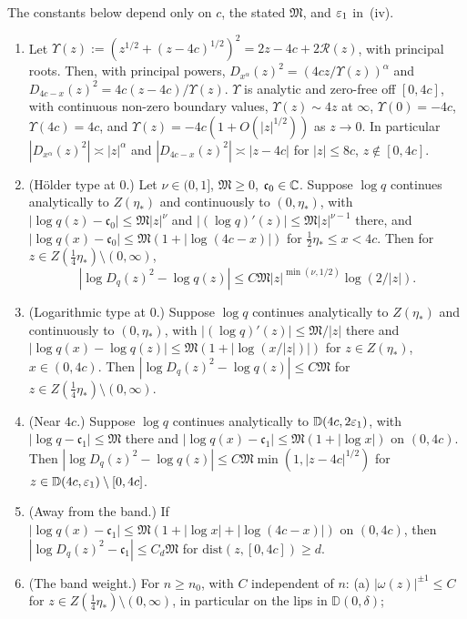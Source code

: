 \begin{lemma}\label{lem:szego}
The constants below depend only on $c$, the stated $\mathfrak M$, and $\varepsilon_1$ in~(iv).
\begin{enumerate}
\item[(i)] Let $\Upsilon(z):=(z^{1/2}+(z-4c)^{1/2})^2=2z-4c+2\mathcal R(z)$, with principal roots. Then, with principal
  powers, $D_{x^\alpha}(z)^2=(4cz/\Upsilon(z))^\alpha$ and $D_{4c-x}(z)^2=4c(z-4c)/\Upsilon(z)$. $\Upsilon$ is analytic
  and zero-free off $[0,4c]$, with continuous non-zero boundary values, $\Upsilon(z)\sim4z$ at $\infty$,
  $\Upsilon(0)=-4c$, $\Upsilon(4c)=4c$, and $\Upsilon(z)=-4c(1+O(|z|^{1/2}))$ as $z\to0$. In particular
  $|D_{x^\alpha}(z)^2|\asymp|z|^\alpha$ and $|D_{4c-x}(z)^2|\asymp|z-4c|$ for $|z|\le8c$, $z\notin[0,4c]$.
\item[(ii)] (H\"older type at $0$.) Let $\nu\in(0,1]$, $\mathfrak M\ge0$, $\mathfrak c_0\in\mathbb{C}$. Suppose $\log q$
  continues analytically to $Z(\eta_*)$ and continuously to $(0,\eta_*)$, with $|\log q(z)-\mathfrak c_0|\le\mathfrak
  M|z|^\nu$ and $|(\log q)'(z)|\le\mathfrak M|z|^{\nu-1}$ there, and $|\log q(x)-\mathfrak c_0|\le\mathfrak
  M(1+|\log(4c-x)|)$ for $\frac12\eta_*\le x<4c$. Then for $z\in Z(\frac14\eta_*)\setminus(0,\infty)$,
  \[
    |\log D_q(z)^2-\log q(z)|\le C\mathfrak M|z|^{\min(\nu,1/2)}\log(2/|z|).
  \]
\item[(iii)] (Logarithmic type at $0$.) Suppose $\log q$ continues analytically to $Z(\eta_*)$ and continuously to
  $(0,\eta_*)$, with $|(\log q)'(z)|\le\mathfrak M/|z|$ there and $|\log q(x)-\log q(z)|\le\mathfrak
  M(1+|\log(x/|z|)|)$ for $z\in Z(\eta_*)$, $x\in(0,4c)$. Then $|\log D_q(z)^2-\log q(z)|\le C\mathfrak M$ for
  $z\in Z(\frac14\eta_*)\setminus(0,\infty)$.
\item[(iv)] (Near $4c$.) Suppose $\log q$ continues analytically to $\mathbb D(4c,2\varepsilon_1)$, with $|\log q-\mathfrak
  c_1|\le\mathfrak M$ there and $|\log q(x)-\mathfrak c_1|\le\mathfrak M(1+|\log x|)$ on $(0,4c)$. Then $|\log
  D_q(z)^2-\log q(z)|\le C\mathfrak M\min(1,|z-4c|^{1/2})$ for $z\in \mathbb D(4c,\varepsilon_1)\setminus[0,4c]$.
\item[(v)] (Away from the band.) If $|\log q(x)-\mathfrak c_1|\le\mathfrak M(1+|\log x|+|\log(4c-x)|)$ on $(0,4c)$,
  then $|\log D_q(z)^2-\mathfrak c_1|\le C_d\mathfrak M$ for $\mathrm{dist}(z,[0,4c])\ge d$.
\item[(vi)] (The band weight.) For $n\ge n_0$, with $C$ independent of $n$:
(a) $|\omega(z)|^{\pm1}\le C$ for $z\in Z(\frac14\eta_*)\setminus(0,\infty)$, in particular on the lips in $\mathbb D(0,\delta)$;

\end{enumerate}
\end{lemma}
